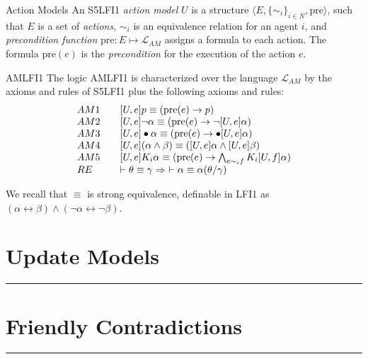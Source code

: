 \documentclass[aspectratio=169,11pt]{beamer}
\newcommand{\sectiondivider}[1][Violet]{%
  \begin{frame}[c]
    \centering
    {\color{Rose}\large\thesection\par}
    \vspace{.35cm}
    {\color{#1}\LARGE\insertsectionhead\par}
    \vspace{.4cm}
    {\color{Gold}\rule{3cm}{.5pt}\par}
  \end{frame}}
\begin{document}
\begin{frame}{Action Models}
An S5LFI1 {\em action model} $U$ is a structure $\langle \mathit{E}, \{\sim_i\}_{i\in N}, \mathrm{pre}\rangle$, such that $E$ is a set of \emph{actions}, $\sim_i$ is an equivalence relation for an agent $i$, and {\em precondition function} $\mathrm{pre}:\mathit{E} \mapsto \mathcal{L}_{AM}$ assigns a formula to each action. The formula $\mathrm{pre}(e)$ is the \emph{precondition} for the execution of the action $e$.
\end{frame}
\begin{frame}
    \begin{block}{AMLFI1}
   The logic AMLFI1 is characterized over the language $\mathcal{L}_{AM}$ by the axioms and rules of S5LFI1 plus the following axioms and rules:
\[
\begin{array}{l@{\qquad}l}
AM1 & [U,e]p \equiv (\text{pre}(e) \rightarrow p)\\
AM2 & [U,e]\neg\alpha \equiv (\text{pre}(e) \rightarrow \neg[U,e]\alpha)\\
AM3 & [U,e]\bullet\alpha \equiv (\text{pre}(e) \rightarrow \bullet[U,e]\alpha)
\\
AM4 & [U,e](\alpha \land \beta)
      \equiv ([U,e]\alpha \land [U,e]\beta)\\
AM5 & [U,e]K_i\alpha
      \equiv (\text{pre}(e) \rightarrow \bigwedge_{e \sim_i f} K_i[U,f]\alpha)\\
RE  & \vdash\theta \equiv \gamma \Rightarrow\ \vdash\alpha \equiv \alpha(\theta/\gamma)
\end{array}
\]
\end{block}
We recall that $\equiv$ is strong equivalence, definable in LFI1 as $(\alpha \leftrightarrow \beta) \land (\neg\alpha \leftrightarrow \neg\beta)$.
\end{frame}
\section[Update Models]{Update Models}
\sectiondivider

\section{Friendly Contradictions}
\sectiondivider

\end{document}

